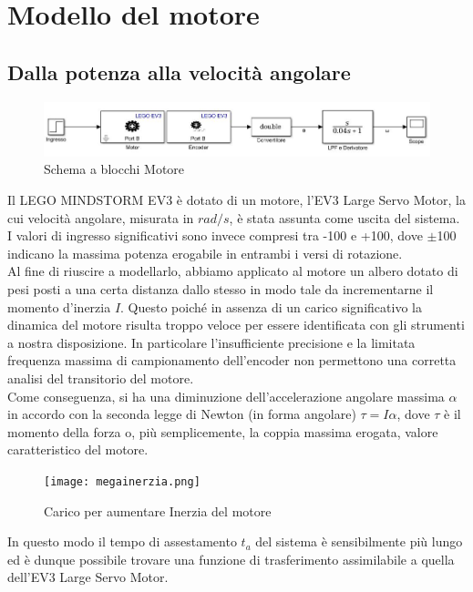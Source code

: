 \chapter{Modello del motore}
\section{Dalla potenza alla velocità angolare}

\begin{figure}[ht]
	\centering
	\includegraphics[width=\textwidth]{motoreSimulink.jpg}
	\caption{Schema a blocchi Motore}
	\label{motoreSimulink}
\end{figure}
Il LEGO MINDSTORM EV3 è dotato di un motore, l'EV3 Large Servo Motor, la cui velocità angolare, misurata in $rad/s$, è stata assunta come uscita del sistema.\\
I valori di ingresso significativi sono invece compresi tra -100 e +100, dove $\pm$100 indicano la massima potenza erogabile in entrambi i versi di rotazione.\\
Al fine di riuscire a modellarlo, abbiamo applicato al motore un albero dotato di pesi posti a una certa distanza dallo stesso in modo tale da incrementarne il momento d'inerzia $I$. Questo poiché in assenza di un carico significativo la dinamica del motore risulta  troppo veloce per  essere identificata con gli strumenti a nostra disposizione. In particolare l'insufficiente precisione e la limitata frequenza massima di campionamento dell'encoder non permettono una corretta analisi del transitorio del motore.\\
Come conseguenza, si ha una diminuzione dell'accelerazione angolare massima $\alpha$ in accordo con la seconda legge di Newton (in forma angolare) $\tau = I\alpha$, dove $\tau$ è il momento della forza o, più semplicemente, la coppia massima erogata, valore caratteristico del motore.
\newpage
\begin{figure}[ht]
	\centering
	\texttt{[image: megainerzia.png]}
	\caption{Carico per aumentare Inerzia del motore}
	\label{megainerzia}
\end{figure}
In questo modo il tempo di assestamento $t_a$ del sistema è sensibilmente più lungo ed è dunque possibile trovare una funzione di trasferimento assimilabile a quella dell'EV3 Large Servo Motor.\\
